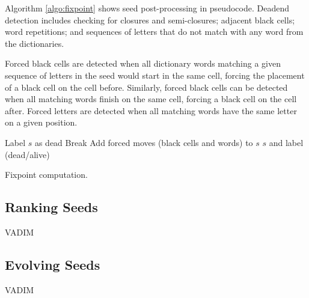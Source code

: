 Algorithm \ref{algo:fixpoint} shows seed post-processing in pseudocode.
Deadend detection includes checking for closures and semi-closures;
adjacent black cells; 
word repetitions; and
sequences of letters that do not match with any word from the dictionaries.

Forced black cells are detected when all dictionary words matching 
a given sequence of letters in the seed would start in the same cell,
forcing the placement of a black cell on the cell before.
Similarly, forced black cells can be detected when 
all matching words finish on the same cell, forcing a black cell 
on the cell after.
Forced letters are detected when all matching words have the same 
letter on a given position.


\begin{algorithm}[t]
\DontPrintSemicolon %
 {
     {
        Label $s$ as dead\;
        Break\;
    }
    Add forced moves (black cells and words) to $s$\;
}
\Return $s$ and label (dead/alive)
\caption{{\sc Fixpoint computation.}}
\label{algo:fixpoint}
\end{algorithm}

\subsection{Ranking Seeds}

VADIM

\subsection{Evolving Seeds}

VADIM
